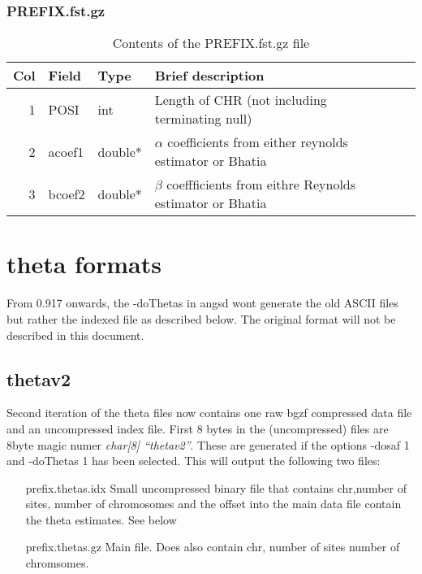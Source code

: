 \documentclass[10pt]{article}
\begin{document}
\subsubsection{PREFIX.fst.gz}
\begin{table}[h]
\begin{tabular}{rllll}
  \hline
  {\bf Col} & {\bf Field} & {\bf Type} & {\bf Brief description} \\
  \hline
  1 & {\sf POSI} & int &  Length of CHR (not including terminating null)\\
  2 & {\sf acoef1} & double* & $\alpha$ coefficients from either reynolds estimator or Bhatia \\
  3 & {\sf bcoef2} & double* & $\beta$ coeffficients from eithre Reynolds estimator or Bhatia\\
  \hline
\end{tabular}\label{tabfstgz}
\caption{Contents of the PREFIX.fst.gz file}
\end{table}

\newpage
\section{theta formats}
From 0.917 onwards, the -doThetas in angsd wont generate the old ASCII files but rather the indexed file as described below. The original format will not be described in this document.\\


\subsection{thetav2}
Second iteration of the theta files now contains one raw bgzf compressed data file and an uncompressed index file. First 8 bytes in the (uncompressed) files are 8byte magic numer \emph{char[8] ``thetav2''}. These are generated if the options -dosaf 1 and -doThetas 1 has been selected. This will output the following two files:

\begin{itemize}
\item[prefix.thetas.idx] Small uncompressed binary file that contains chr,number of sites, number of chromosomes and the offset into the main data file contain the theta estimates. See below
\item[prefix.thetas.gz] Main file. Does also contain chr, number of sites number of chromsomes.
\end{itemize}
\end{document}
